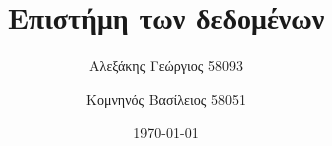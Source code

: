 \title{Επιστήμη των δεδομένων}
\author{Αλεξάκης Γεώργιος 58093 \and Κομνηνός Βασίλειος 58051}
\date{\today}